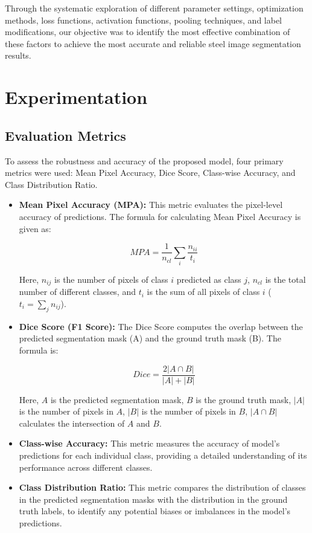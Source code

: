 \documentclass[]{article}
\begin{document}
\begin{itemize}
\end{itemize}

Through the systematic exploration of different parameter settings, optimization methods, loss functions, activation functions, pooling techniques, and label modifications, our objective was to identify the most effective combination of these factors to achieve the most accurate and reliable steel image segmentation results.

\section{Experimentation}
\subsection{Evaluation Metrics}

To assess the robustness and accuracy of the proposed model, four primary metrics were used: Mean Pixel Accuracy, Dice Score, Class-wise Accuracy, and Class Distribution Ratio.

\begin{itemize}
	\item \textbf{Mean Pixel Accuracy (MPA):} This metric evaluates the pixel-level accuracy of predictions. The formula for calculating Mean Pixel Accuracy is given as:
	
	\[ MPA = \frac{1}{n_{cl}} \sum_{i} \frac{n_{ii}}{t_i} \]
	
	Here, $n_{ij}$ is the number of pixels of class $i$ predicted as class $j$, $n_{cl}$ is the total number of different classes, and $t_{i}$ is the sum of all pixels of class $i$ ($t_{i} = \sum_{j} n_{ij}$).
	
	\item \textbf{Dice Score (F1 Score):} The Dice Score computes the overlap between the predicted segmentation mask (A) and the ground truth mask (B). The formula is:
	
	\[ Dice = \frac{2 |A \cap B|}{|A| + |B|} \]
	
	Here, $A$ is the predicted segmentation mask, $B$ is the ground truth mask, $|A|$ is the number of pixels in $A$, $|B|$ is the number of pixels in $B$, $|A \cap B|$ calculates the intersection of $A$ and $B$.
	
	\item \textbf{Class-wise Accuracy:} This metric measures the accuracy of model's predictions for each individual class, providing a detailed understanding of its performance across different classes.
	
	\item \textbf{Class Distribution Ratio:} This metric compares the distribution of classes in the predicted segmentation masks with the distribution in the ground truth labels, to identify any potential biases or imbalances in the model's predictions.
\end{itemize}
\end{document}
